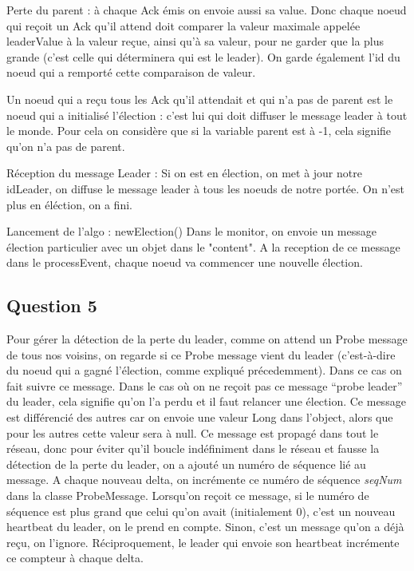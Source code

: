 \documentclass[paper=a4, fontsize=11pt]{article} %
\begin{document}
Perte du parent : à chaque Ack émis on envoie aussi sa value. Donc chaque noeud qui reçoit un Ack qu'il attend doit comparer la valeur maximale appelée leaderValue à la valeur reçue, ainsi qu'à sa valeur, pour ne garder que la plus grande (c'est celle qui déterminera qui est le leader). On garde également l'id du noeud qui a remporté cette comparaison de valeur.

Un noeud qui a reçu tous les Ack qu'il attendait et qui n'a pas de parent est le noeud qui a initialisé l'élection : c'est lui qui doit diffuser le message leader à tout le monde. Pour cela on considère que si la variable parent est à -1, cela signifie qu'on n'a pas de parent.

Réception du message Leader :
Si on est en élection, on met à jour notre idLeader, on diffuse le message leader à tous les noeuds de notre portée. On n'est plus en éléction, on a fini.


Lancement de l'algo : newElection()
Dans le monitor, on envoie un message élection particulier avec un objet dans le "content". A la reception de ce message dans le processEvent, chaque noeud va commencer une nouvelle élection.

\subsection{Question 5}
Pour gérer la détection de la perte du leader, comme on attend un Probe message de tous nos voisins, on regarde si ce Probe message vient du leader (c'est-à-dire du noeud qui a gagné l'élection, comme expliqué précedemment).
Dans ce cas on fait suivre ce message.
Dans le cas où on ne reçoit pas ce message \enquote{probe leader} du leader, cela signifie qu'on l'a perdu et il faut relancer une élection.
Ce message est différencié des autres car on envoie une valeur Long dans l'object, alors que pour les autres cette valeur sera à null.
Ce message est propagé dans tout le réseau, donc pour éviter qu'il boucle indéfiniment dans le réseau et fausse la détection de la perte du leader, on a ajouté un numéro de séquence lié au message.
A chaque nouveau delta, on incrémente ce numéro de séquence \textit{seqNum} dans la classe ProbeMessage.
Lorsqu'on reçoit ce message, si le numéro de séquence est plus grand que celui qu'on avait (initialement 0), c'est un nouveau heartbeat du leader, on le prend en compte.
Sinon, c'est un message qu'on a déjà reçu, on l'ignore. Réciproquement, le leader qui envoie son heartbeat incrémente ce compteur à chaque delta.
\end{document}
